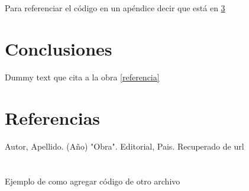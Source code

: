 \documentclass{article}
\begin{document}
Para referenciar el código en un apéndice decir que está en \ref{codigo}

\section{Conclusiones}
Dummy text que cita a la obra \ref{referencia}

\section{Referencias}
\setcounter{secnumdepth}{4}
\renewcommand{\theparagraph}{\textsuperscript{[\arabic{paragraph}]}}

\paragraph{} Autor, Apellido. (Año) "Obra". Editorial, Pais. Recuperado de url\label{referencia}

\appendix
\renewcommand\thesection{Apéndice \Alph{section}}

\section{}\label{codigo}
Ejemplo de como agregar código de otro archivo


\section{}
\end{document}
